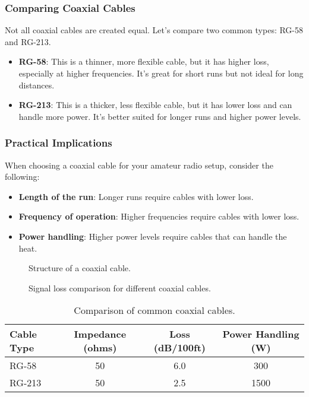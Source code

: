 \subsubsection*{Comparing Coaxial Cables}
Not all coaxial cables are created equal. Let's compare two common types: RG-58 and RG-213.
\begin{itemize}
    \item \textbf{RG-58}: This is a thinner, more flexible cable, but it has higher loss, especially at higher frequencies. It's great for short runs but not ideal for long distances.
    \item \textbf{RG-213}: This is a thicker, less flexible cable, but it has lower loss and can handle more power. It's better suited for longer runs and higher power levels.
\end{itemize}

\subsubsection*{Practical Implications}
When choosing a coaxial cable for your amateur radio setup, consider the following:
\begin{itemize}
    \item \textbf{Length of the run}: Longer runs require cables with lower loss.
    \item \textbf{Frequency of operation}: Higher frequencies require cables with lower loss.
    \item \textbf{Power handling}: Higher power levels require cables that can handle the heat.
\end{itemize}

\begin{figure}[h!]
    \centering
    \caption{Structure of a coaxial cable.}
    \label{fig:coax-structure}
\end{figure}

\begin{figure}[h!]
    \centering
    \caption{Signal loss comparison for different coaxial cables.}
    \label{fig:coax-loss}
\end{figure}

\begin{table}[h!]
    \centering
    \begin{tabular}{|l|c|c|c|}
        \hline
        \textbf{Cable Type} & \textbf{Impedance (ohms)} & \textbf{Loss (dB/100ft)} & \textbf{Power Handling (W)} \\
        \hline
        RG-58 & 50 & 6.0 & 300 \\
        RG-213 & 50 & 2.5 & 1500 \\
        \hline
    \end{tabular}
    \caption{Comparison of common coaxial cables.}
    \label{tab:coax-comparison}
\end{table}

